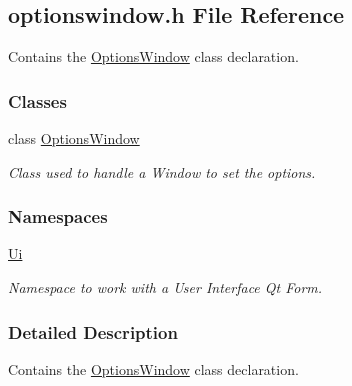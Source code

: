\hypertarget{a00020}{}\subsection{optionswindow.\+h File Reference}
\label{a00020}


Contains the \hyperlink{a00006}{Options\+Window} class declaration.  


\subsubsection*{Classes}
\begin{DoxyCompactItemize}
\item 
class \hyperlink{a00006}{Options\+Window}
\begin{DoxyCompactList}\small\item\em Class used to handle a Window to set the options. \end{DoxyCompactList}\end{DoxyCompactItemize}
\subsubsection*{Namespaces}
\begin{DoxyCompactItemize}
\item 
 \hyperlink{a00027}{Ui}
\begin{DoxyCompactList}\small\item\em Namespace to work with a User Interface Qt Form. \end{DoxyCompactList}\end{DoxyCompactItemize}


\subsubsection{Detailed Description}
Contains the \hyperlink{a00006}{Options\+Window} class declaration. 

